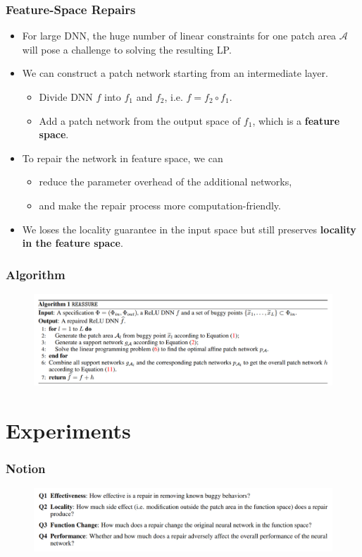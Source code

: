 \documentclass[aspectratio=169 %
,serif,mathserif]{beamer}
\begin{document}
\begin{frame}
	\frametitle{Feature-Space Repairs}
	\begin{itemize}
		\item For large DNN, the huge number of linear constraints for one patch area $\mathcal{A}$ will pose a challenge to solving the resulting LP. \pause
		\item We can construct a patch network starting from an intermediate layer.
		\begin{itemize}
			\item Divide DNN $f$ into $f_1$ and $f_2$, i.e. $f=f_2 \circ f_1$.
			\item Add a patch network from the output space of $f_1$, which is a \textbf{feature space}.
		\end{itemize} \pause
		\item To repair the network in feature space, we can
		\begin{itemize}
			\item reduce the parameter overhead of the additional networks,
			\item and make the repair process more computation-friendly.
		\end{itemize} \pause
		\item We loses the locality guarantee in the input space but still preserves \textbf{locality in the feature space}.
	\end{itemize}
\end{frame}

\begin{frame}
	\frametitle{Algorithm}
	\begin{figure}[htbp]
		\includegraphics[width=\linewidth]{7.png}
	\end{figure}
\end{frame}

\section{Experiments}
\begin{frame}
	\frametitle{Notion}
	\begin{figure}[htbp]
		\includegraphics[width=\linewidth]{8.png}
	\end{figure}
\end{frame}
\end{document}
